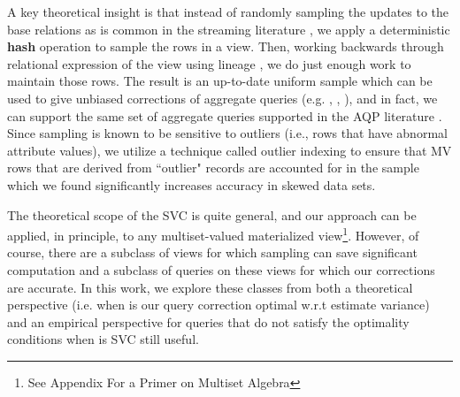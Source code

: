 A key theoretical insight is that instead of randomly sampling the updates to the base relations as is common in the streaming literature \cite{babcock2002sampling, DBLP:journals/pvldb/MankuM12}, we apply a deterministic \textbf{hash} operation to sample the rows in a view.
Then, working backwards through relational expression of the view using lineage \cite{DBLP:journals/vldb/CuiW03}, we do just enough work to maintain those rows.
The result is an up-to-date uniform sample which can be used to give unbiased corrections of aggregate queries (e.g. \sumfunc, \countfunc, \avgfunc), and in fact, we can support the same set of aggregate queries supported in the AQP literature \cite{AgarwalMPMMS13, agarwalknowing}.
Since sampling is known to be sensitive to outliers (i.e., rows that have abnormal attribute values), we
utilize a technique called outlier indexing \cite{chaudhuri2001overcoming} to ensure that MV rows that are derived from ``outlier" records are accounted for in the sample which we found significantly increases accuracy in skewed data sets.

The theoretical scope of the SVC is quite general, and our approach can be applied, in principle, to any multiset-valued materialized view\footnote{See Appendix For a Primer on Multiset Algebra}.
However, of course, there are a subclass of views for which sampling can save significant computation and a subclass of queries on these views for which our corrections are accurate.
In this work, we explore these classes from both a theoretical perspective (i.e. when is our query correction optimal w.r.t estimate variance) and an empirical perspective for queries that do not satisfy the optimality conditions when is SVC still useful.

